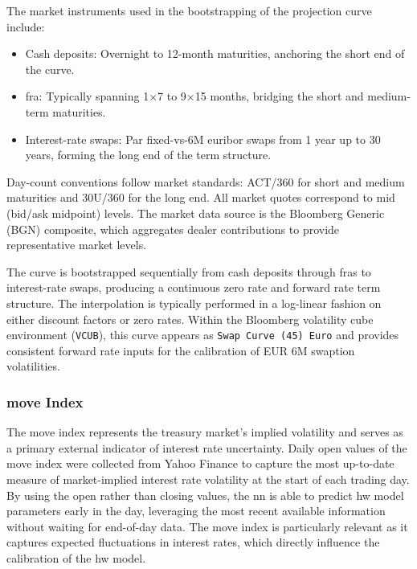 The market instruments used in the bootstrapping of the projection curve include:
\begin{itemize}
	\item Cash deposits: Overnight to 12-month maturities, anchoring the short end of the curve.
	\item \ac{fra}: Typically spanning 1×7 to 9×15 months, bridging the short and medium-term maturities.
	\item Interest-rate swaps: Par fixed-vs-6M \ac{euribor} swaps from 1 year up to 30 years, forming the long end of the term structure.
\end{itemize}

Day-count conventions follow market standards: ACT/360 for short and medium maturities and 30U/360 for the long end. All market quotes correspond to mid (bid/ask midpoint) levels. The market data source is the Bloomberg Generic (BGN) composite, which aggregates dealer contributions to provide representative market levels.

The curve is bootstrapped sequentially from cash deposits through \ac{fra}s to interest-rate swaps, producing a continuous zero rate and forward rate term structure. The interpolation is typically performed in a log-linear fashion on either discount factors or zero rates. Within the Bloomberg volatility cube environment (\texttt{VCUB}), this curve appears as \texttt{Swap Curve (45) Euro} and provides consistent forward rate inputs for the calibration of EUR 6M swaption volatilities.

\subsubsection{\ac{move} Index}
The \ac{move} index represents the treasury market's implied volatility and serves as a primary external indicator of interest rate uncertainty. Daily open values of the \ac{move} index were collected from Yahoo Finance to capture the most up-to-date measure of market-implied interest rate volatility at the start of each trading day. By using the open rather than closing values, the \ac{nn} is able to predict \ac{hw} model parameters early in the day, leveraging the most recent available information without waiting for end-of-day data. The \ac{move} index is particularly relevant as it captures expected fluctuations in interest rates, which directly influence the calibration of the \ac{hw} model.

